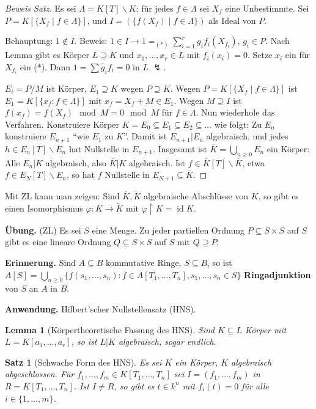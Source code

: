 \documentclass[headsepline=true,DIV=11]{scrartcl}
\newtheorem*{theorem}{Satz}
\newtheorem*{lemma}{Lemma}
\theoremstyle{definition}
\renewcommand{\bar}[1]{\overline{#1}}
\newcommand{\id}{\operatorname{id}}
\begin{document}
\begin{proof}[Beweis Satz]
  Es sei $\Lambda=K[T]\backslash K$; für jedes $f\in\Lambda$ sei $X_f$ eine Unbestimmte. Sei $P=K[\{X_f\mid f\in\Lambda\}]$, und $I=(\{f(X_f)\mid
  f\in\Lambda\})$ als Ideal von $P$.

  Behauptung: $1\not\in I$. Beweis: $1\in I\rightarrow 1=_{(*)}\sum\limits_{i=1}^r g_i f_i(X_{f_i})$, $g_i\in P$. Nach Lemma gibt es Körper
  $L\supseteq K$ und $x_1,\ldots,x_r\in L$ mit $f_i(x_i)=0$. Setze $x_i$ ein für $X_{f_i}$ ein (*). Dann $1=\sum\tilde{g_i}f_i=0$ in $L$ $\lightning$.

  $E_i=P/M$ ist Körper, $E_1\supseteq K$ wegen $P\supseteq K$. Wegen $P=K[\{X_f\mid f\in\Lambda\}]$ ist $E_1=K[\{x_f:f\in\Lambda\}]$ mit $x_f=X_f+M\in
  E_1$. Wegen $M\supseteq I$ ist $f(x_f) = f(X_f)\mod M = 0\mod M$ für $f\in\Lambda$. Nun wiederhole das Verfahren. Konstruiere Körper $K=E_0\subseteq
  E_1\subseteq E_2\subseteq \ldots$ wie folgt: Zu $E_n$ konstruiere $E_{n+1}$ ``wie $E_1$ zu $K$''. Damit ist $E_{n+1}|E_n$ algebraisch, und jedes
  $h\in E_n[T]\backslash E_n$ hat Nullstelle in $E_{n+1}$. Insgesamt ist $\bar{K}=\bigcup\limits_{n\ge 0}E_n$ ein Körper: Alle $E_n|K$ algebraisch,
  also $\bar{K}|K$ algebraisch. Ist $f\in\bar{K}[T]\backslash\bar{K}$, etwa $f\in E_N[T]\backslash E_n$, so hat $f$ Nullstelle in
  $E_{N+1}\subseteq\bar{K}$.
\end{proof}

Mit ZL kann man zeigen: Sind $\bar{K},\tilde{K}$ algebraische Abschlüsse von $K$, so gibt es einen Isomorphismus $\varphi:\bar{K}\rightarrow\tilde{K}$
mit $\varphi\upharpoonright K=\id K$.

{\bf Übung.} (ZL) Es sei $S$ eine Menge. Zu jeder partiellen Ordnung $P\subseteq S\times S$ auf $S$ gibt es eine lineare Ordnung $Q\subseteq S\times
S$ auf $S$ mit $Q\supseteq P$.

{\bf Erinnerung.} Sind $A\subseteq B$ kommutative Ringe, $S\subseteq B$, so ist $A[S]=\bigcup\limits_{n\ge 0}\{f(s_1,\ldots,s_n):f\in
A[T_1,\ldots,T_n],s_1,\ldots,s_n\in S\}$ {\bf Ringadjunktion} von $S$ an $A$ in $B$.

{\bf Anwendung.} Hilbert'scher Nullstellensatz (HNS).

\begin{lemma}[Körpertheoretische Fassung des HNS]
  Sind $K\subseteq L$ Körper mit $L=K[a_1,\ldots,a_r]$, so ist $L|K$ algebraisch, sogar endlich.
\end{lemma}

\begin{theorem}[Schwache Form des HNS]
  Es sei $K$ ein Körper, $K$ algebraisch abgeschlossen. Für $f_1,\ldots,f_m\in K[T_1,\ldots,T_n]$ sei $I=(f_1,\ldots,f_m)$ in
  $R=K[T_1,\ldots,T_n]$. Ist $I\neq R$, so gibt es $t\in k^n$ mit $f_i(t)=0$ für alle $i\in\{1,\ldots,m\}$.
\end{theorem}
\end{document}
